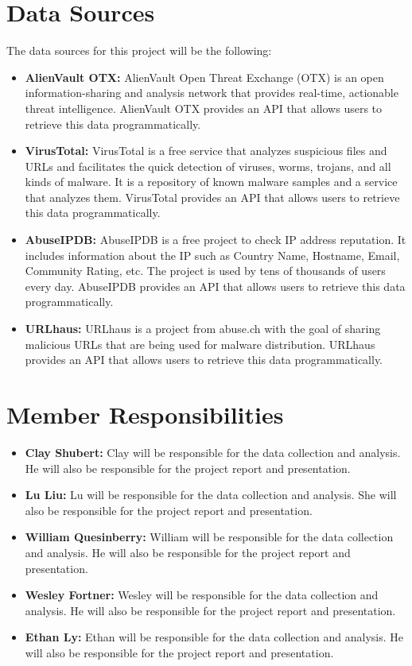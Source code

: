 \documentclass[letterpaper, 10 pt, conference]{ieeeconf}  %
\begin{document}
\section{Data Sources}

The data sources for this project will be the following:
\begin{itemize}
    \item \textbf{AlienVault OTX:} AlienVault Open Threat Exchange (OTX) is an open information-sharing and analysis network that provides real-time, actionable threat intelligence. AlienVault OTX provides an API that allows users to retrieve this data programmatically. 
    \item \textbf{VirusTotal:} VirusTotal is a free service that analyzes suspicious files and URLs and facilitates the quick detection of viruses, worms, trojans, and all kinds of malware. It is a repository of known malware samples and a service that analyzes them. VirusTotal provides an API that allows users to retrieve this data programmatically.
    \item \textbf{AbuseIPDB:} AbuseIPDB is a free project to check IP address reputation. It includes information about the IP such as Country Name, Hostname, Email, Community Rating, etc. The project is used by tens of thousands of users every day. AbuseIPDB provides an API that allows users to retrieve this data programmatically.
    \item \textbf{URLhaus:} URLhaus is a project from abuse.ch with the goal of sharing malicious URLs that are being used for malware distribution. URLhaus provides an API that allows users to retrieve this data programmatically.
\end{itemize}

\section{Member Responsibilities}

\begin{itemize}
    \item \textbf{Clay Shubert:} Clay will be responsible for the data collection and analysis. He will also be responsible for the project report and presentation.
    \item \textbf{Lu Liu:} Lu will be responsible for the data collection and analysis. She will also be responsible for the project report and presentation.
    \item \textbf{William Quesinberry:} William will be responsible for the data collection and analysis. He will also be responsible for the project report and presentation.
    \item \textbf{Wesley Fortner:} Wesley will be responsible for the data collection and analysis. He will also be responsible for the project report and presentation.
    \item \textbf{Ethan Ly:} Ethan will be responsible for the data collection and analysis. He will also be responsible for the project report and presentation.
\end{itemize}
\end{document}
